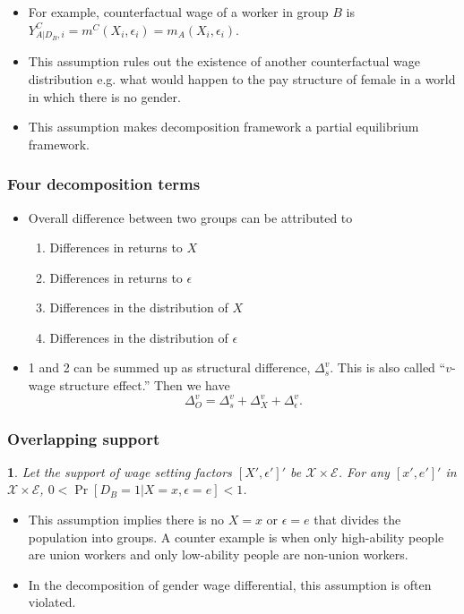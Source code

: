 \documentclass[a4paper, 12pt]{article}
\makeatletter
\newtheorem*{assumption*}{\assumptionnumber}
\providecommand{\assumptionnumber}{}
\newenvironment{assumption}[2]
 {%
  \renewcommand{\assumptionnumber}{Assumption #1 \textit{(#2)}}%
  \begin{assumption*}%
  \protected@edef\@currentlabel{#1}%
 }
 {%
  \end{assumption*}
 }
\makeatother
\begin{document}
\begin{itemize}
\item For example, counterfactual wage of a worker in group $B$ is $Y^C_{A|D_B, i}=m^C(X_i, \epsilon_i)=m_A(X_i, \epsilon_i)$.
\item This assumption rules out the existence of another counterfactual wage distribution e.g. what would happen to the pay structure of female in a world in which there is no gender.
\item This assumption makes decomposition framework a partial equilibrium framework.
\end{itemize}

\subsubsection{Four decomposition terms}
\begin{itemize}
\item Overall difference between two groups can be attributed to
\begin{enumerate}
\item Differences in returns to $X$
\item Differences in returns to $\epsilon$
\item Differences in the distribution of $X$
\item Differences in the distribution of $\epsilon$
\end{enumerate}

\item 1 and 2 can be summed up as structural difference, $\Delta^v_s$. This is also called ``$v$-wage structure effect.'' Then we have
\begin{equation}
\Delta^v_O = \Delta^v_s + \Delta^v_X + \Delta^v_\epsilon.
\end{equation} 
\end{itemize}

\subsubsection{Overlapping support}
\begin{assumption}{4}{Overlapping Support} Let the support of wage setting factors $[X', \epsilon']'$ be $\mathcal{X} \times \mathcal{E} $. For any $[x', e']'$ in $\mathcal{X} \times \mathcal{E} $, $0<\Pr[D_B=1|X=x, \epsilon = e]<1$.
\end{assumption}

\begin{itemize}
\item This assumption implies there is no $X=x$ or $\epsilon =e$ that divides the population into groups. A counter example is when only high-ability people are union workers and only low-ability people are non-union workers.
\item In the decomposition of gender wage differential, this assumption is often violated.
\end{itemize}
\end{document}
